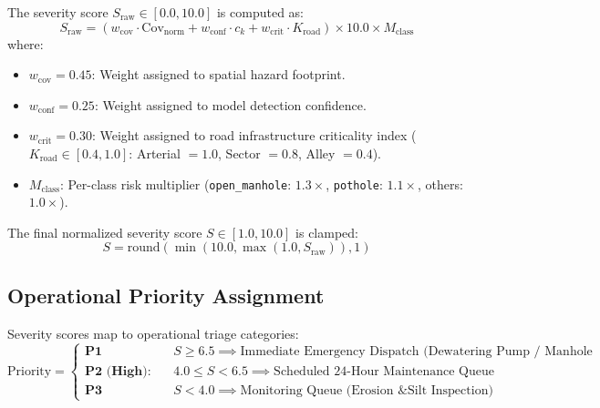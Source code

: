 \documentclass[11pt,a4paper]{article}
\begin{document}
The severity score $S_{\text{raw}} \in [0.0, 10.0]$ is computed as:
\begin{equation}
S_{\text{raw}} = \left( w_{\text{cov}} \cdot \text{Cov}_{\text{norm}} + w_{\text{conf}} \cdot c_k + w_{\text{crit}} \cdot K_{\text{road}} \right) \times 10.0 \times M_{\text{class}}
\end{equation}
where:
\begin{itemize}[leftmargin=*]
    \item $w_{\text{cov}} = 0.45$: Weight assigned to spatial hazard footprint.
    \item $w_{\text{conf}} = 0.25$: Weight assigned to model detection confidence.
    \item $w_{\text{crit}} = 0.30$: Weight assigned to road infrastructure criticality index ($K_{\text{road}} \in [0.4, 1.0]$: Arterial $= 1.0$, Sector $= 0.8$, Alley $= 0.4$).
    \item $M_{\text{class}}$: Per-class risk multiplier (\texttt{open\_manhole}: $1.3\times$, \texttt{pothole}: $1.1\times$, others: $1.0\times$).
\end{itemize}

The final normalized severity score $S \in [1.0, 10.0]$ is clamped:
\begin{equation}
S = \text{round}\left(\min\left(10.0, \max\left(1.0, S_{\text{raw}}\right)\right), 1\right)
\end{equation}

\subsection{Operational Priority Assignment}
Severity scores map to operational triage categories:
\begin{equation}
\text{Priority} = \begin{cases}
\textbf{P1 (Critical):} & S \ge 6.5 \implies \text{Immediate Emergency Dispatch (Dewatering Pump / Manhole Barrier)} \\
\textbf{P2 (High):} & 4.0 \le S < 6.5 \implies \text{Scheduled 24-Hour Maintenance Queue} \\
\textbf{P3 (Routine):} & S < 4.0 \implies \text{Monitoring Queue (Erosion \& Silt Inspection)}
\end{cases}
\end{equation}

\end{document}

